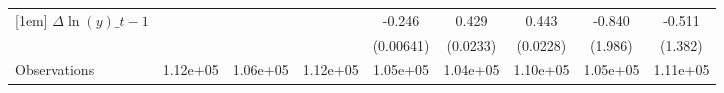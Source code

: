 {\begin{tabular}{l*{8}{c}}
[1em]
$\Delta \ln(y)\_{t-1}$&                  &                  &                  &   -0.246\sym{***}&    0.429\sym{***}&    0.443\sym{***}&   -0.840         &   -0.511         \\
          &                  &                  &                  &(0.00641)         & (0.0233)         & (0.0228)         &  (1.986)         &  (1.382)         \\
\hline
Observations& 1.12e+05         & 1.06e+05         & 1.12e+05         & 1.05e+05         & 1.04e+05         & 1.10e+05         & 1.05e+05         & 1.11e+05         \\
\hline\hline
\end{tabular}
}
